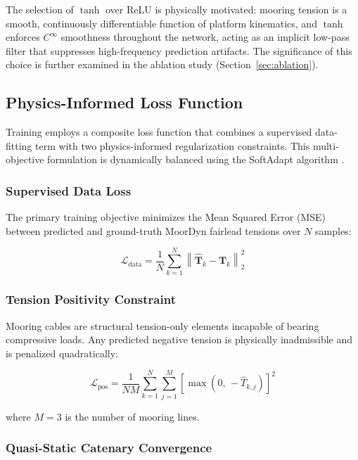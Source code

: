 \documentclass[preprint,12pt]{elsarticle}
\begin{document}
The selection of $\tanh$ over ReLU is physically motivated: mooring tension is a smooth, continuously differentiable function of platform kinematics, and $\tanh$ enforces $C^\infty$ smoothness throughout the network, acting as an implicit low-pass filter that suppresses high-frequency prediction artifacts. The significance of this choice is further examined in the ablation study (Section~\ref{sec:ablation}).

\subsection{Physics-Informed Loss Function}
\label{sec:loss}

Training employs a composite loss function that combines a supervised data-fitting term with two physics-informed regularization constraints. This multi-objective formulation is dynamically balanced using the SoftAdapt algorithm \cite{heiss2019softadapt}.

\subsubsection{Supervised Data Loss}

The primary training objective minimizes the Mean Squared Error (MSE) between predicted and ground-truth MoorDyn fairlead tensions over $N$ samples:

\begin{equation}
\label{eq:data_loss}
    \mathcal{L}_{\text{data}} = \frac{1}{N} \sum_{k=1}^{N} \left\| \hat{\mathbf{T}}_k - \mathbf{T}_k \right\|_2^2
\end{equation}

\subsubsection{Tension Positivity Constraint}

Mooring cables are structural tension-only elements incapable of bearing compressive loads. Any predicted negative tension is physically inadmissible and is penalized quadratically:

\begin{equation}
\label{eq:positivity}
    \mathcal{L}_{\text{pos}} = \frac{1}{NM} \sum_{k=1}^{N} \sum_{j=1}^{M} \left[\max\!\left(0,\, -\hat{T}_{k,j}\right)\right]^2
\end{equation}

\noindent where $M = 3$ is the number of mooring lines.

\subsubsection{Quasi-Static Catenary Convergence}
\end{document}
